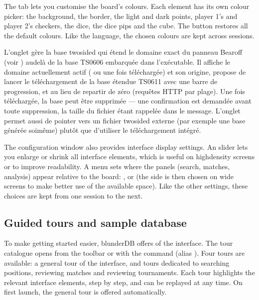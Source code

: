 \documentclass[letterpaper,10pt,english]{sphinxmanual}
\begin{document}
\sphinxAtStartPar
The  tab lets you customise the board’s colours. Each element has its own colour picker: the background, the border, the light and dark points, player 1’s and player 2’s checkers, the dice, the dice pips and the cube. The  button restores all the default colours. Like the language, the chosen colours are kept across sessions.

\sphinxAtStartPar
L’onglet  gère la base two\sphinxhyphen{}sided qui étend le domaine exact du
panneau Bearoff (voir {\hyperref[\detokenize{manuel:panneau-epc}]{}}) au\sphinxhyphen{}delà de la base TS\sphinxhyphen{}06\sphinxhyphen{}06
embarquée dans l’exécutable. Il affiche le domaine actuellement actif
( ou  une fois téléchargée) et son origine, propose de
lancer le téléchargement de la base étendue TS\sphinxhyphen{}06\sphinxhyphen{}11 avec une barre de
progression, et  au
lieu de repartir de zéro (requêtes HTTP par plage). Une fois téléchargée, la
base peut être supprimée — une confirmation est demandée avant toute
suppression, la taille du fichier étant rappelée dans le message. L’onglet
permet aussi de pointer vers un fichier  two\sphinxhyphen{}sided externe (par exemple
une base générée soi\sphinxhyphen{}même) plutôt que d’utiliser le téléchargement intégré.

\sphinxAtStartPar
The configuration window also provides interface display settings. An  slider lets you enlarge or shrink all interface elements, which is useful on high\sphinxhyphen{}density screens or to improve readability. A  menu sets where the panels (search, matches, analysis) appear relative to the board: ,  or  (the side is then chosen on wide screens to make better use of the available space). Like the other settings, these choices are kept from one session to the next.


\subsection{Guided tours and sample database}
\label{\detokenize{manuel:visites-guidees-et-base-d-exemple}}\label{\detokenize{manuel:visites-guidees}}
\sphinxAtStartPar
To make getting started easier, blunderDB offers  of the interface. The tour catalogue opens from the toolbar or with the  command (alias ). Four tours are available: a general tour of the interface, and tours dedicated to searching positions, reviewing matches and reviewing tournaments. Each tour highlights the relevant interface elements, step by step, and can be replayed at any time. On first launch, the general tour is offered automatically.
\end{document}
